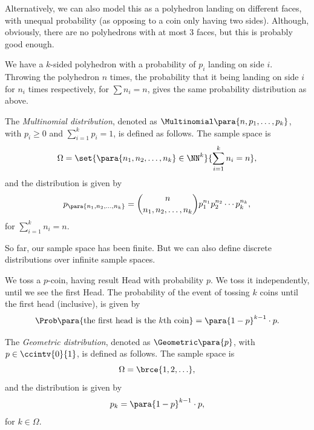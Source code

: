 Alternatively, we can also model this as a polyhedron landing on different faces, with unequal probability (as opposing to a coin only having two sides). Although, obviously, there are no polyhedrons with at most 3 faces, but this is probably good enough.

\begin{example}
    \label{ex:polyhedron-different-sides}%
    We have a \(k\)-sided polyhedron with a probability of \(p_i\) landing on side \(i\). Throwing the polyhedron \(n\) times, the probability that it being landing on side \(i\) for \(n_i\) times respectively, for \(\sum n_i = n\), gives the same probability distribution as above.
\end{example}

\begin{definition}
    \label{def:multinomial-distribution}%
    The \emph{Multinomial distribution}, denoted as \(\Multinomial\para{n, p_1, \ldots, p_k}\), with \(p_i \geq 0\) and \(\sum_{i = 1}^{k} p_i = 1\), is defined as follows. The sample space is
    \[
        \Omega = \set{\para{n_1, n_2, \ldots, n_k} \in \NN^k}{\sum_{i = 1}^{k} n_i = n},
    \]
    and the distribution is given by
    \[
        p_{\para{n_1, n_2, \ldots, n_k}} = \binom{n}{n_1, n_2, \ldots, n_k} p_1^{n_1} p_2^{n_2} \cdots p_k^{n_k},
    \]
    for \(\sum_{i = 1}^{k} n_i = n\).
\end{definition}

So far, our sample space has been finite. But we can also define discrete distributions over infinite sample spaces.

\begin{example}
    \label{ex:tossing-coins-until-head}%
    We toss a \(p\)-coin, having result Head with probability \(p\). We toss it independently, until we see the first Head. The probability of the event of tossing \(k\) coins until the first head (inclusive), is given by
    \[
        \Prob\para{\text{the first head is the }k\text{th coin}} = \para{1 - p}^{k - 1} \cdot p.
    \]
\end{example}

\begin{definition}
    \label{def:geometric-distribution}%
    The \emph{Geometric distribution}, denoted as \(\Geometric\para{p}\), with \(p \in \ccintv{0}{1}\), is defined as follows. The sample space is
    \[
        \Omega = \brce{1, 2, \ldots},
    \]
    and the distribution is given by
    \[
        p_k = \para{1 - p}^{k - 1} \cdot p,
    \]
    for \(k \in \Omega\).
\end{definition}

